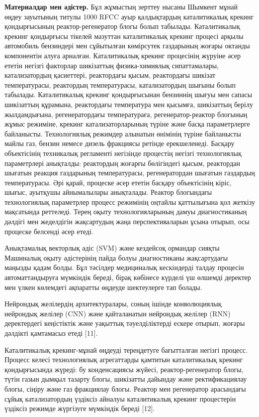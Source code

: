 \begin{multicols}{2}
{\bfseries Материалдар мен әдістер.} Бұл жұмыстың зерттеу нысаны Шымкент
мұнай өңдеу зауытының титулы 1000 RFCC ауыр қалдықтардың каталитикалық
крекинг қондырғысының реактор-регенератор блогы болып табылады.
Каталитикалық крекинг қондырғысы тікелей мазуттан каталитикалық крекинг
процесі арқылы автомобиль бензиндері мен сұйытылған көмірсутек
газдарының жоғары октанды компонентін алуға арналған. Каталитикалық
крекинг процесінің жүруіне әсер ететін негізгі факторлар шикізаттың
физика-химиялық сипаттамалары, катализатордың қасиеттері, реактордағы
қысым, реактордағы шикізат температурасы, реактордың температурасы,
катализатордың шығыны болып табылады. Каталитикалық крекинг
қондырғысынан бензиннің шығуы мен сапасы шикізаттың құрамына,
реактордағы температура мен қысымға, шикізаттың берілу жылдамдығына,
регенератордағы температураға, регенератор-реактор блогының жұмыс
режиміне, крекинг катализаторларының түріне және басқа параметрлерге
байланысты. Технологиялық режимдер алынатын өнімінің түріне байланысты
майлы газ, бензин немесе дизель фракциясы ретінде ерекшеленеді. Басқару
объектісінің техникалық регламенті негізінде процестің негізгі
технологиялық параметрлері анықталды: реактордың жоғарғы бөлігіндегі
қысым, реактордан шығатын реакция газдарының температурасы,
регенератордан шығатын газдардың температурасы. Әрі қарай, процеске әсер
ететін басқару объектісінің кіріс, шығыс, ауытқушы айнымалылары
анықталады. Реактор блогындағы технологиялық параметрлер процесс
режимінің оңтайлы қаттылығына қол жеткізу мақсатында реттеледі. Терең
оқыту технологияларының дамуы диагностиканың дәлдігі мен жеделдігін
жақсартудың жаңа перспективаларын ұсына отырып, осы процеске белсенді
әсер етеді.

Анықтамалық векторлық әдіс (SVM) және кездейсоқ ормандар сияқты
Машиналық оқыту әдістерінің пайда болуы диагностиканы жақсартудағы
маңызды қадам болды. Бұл тәсілдер медициналық кескіндерді талдау
процесін автоматтандыруға мүмкіндік береді, бірақ көбінесе күрделі үш
өлшемді деректер мен үлкен көлемдегі ақпаратты өңдеуде шектеулерге тап
болады.

Нейрондық желілердің архитектуралары, соның ішінде конволюциялық
нейрондық желілер (CNN) және қайталанатын нейрондық желілер (RNN)
деректердегі кеңістіктік және уақыттық тәуелділіктерді ескере отырып,
жоғары дәлдікті қамтамасыз етеді {[}11{]}.

Каталитикалық крекинг-мұнай өңдеуді тереңдетуге бағытталған негізгі
процесс. Процесс келесі технологиялық агрегаттарды қамтитын
каталитикалық крекинг қондырғысында жүреді: бу конденсациясы жүйесі,
реактор-регенератор блогы, түтін газын дымқыл тазарту блогы, шикізатты
дайындау және ректификациялау блогы, сіңіру және газ фракциялау блогы.
Реактор мен регенератор арасындағы сұйық катализатордың үздіксіз айналуы
каталитикалық крекинг процестерін үздіксіз режимде жүргізуге мүмкіндік
береді {[}12{]}.
\end{multicols}

